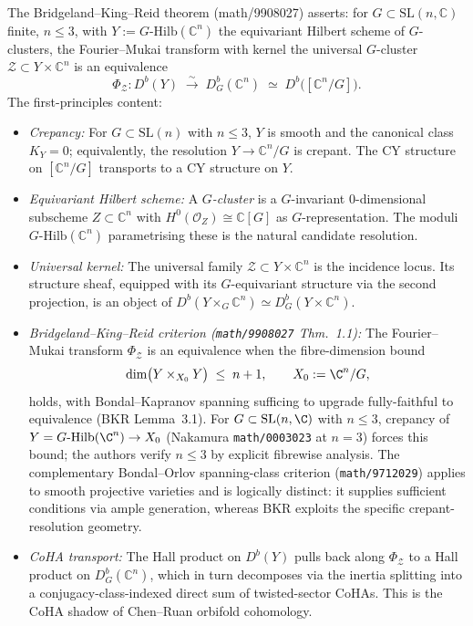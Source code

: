 The Bridgeland--King--Reid theorem (math/9908027) asserts: for $G \subset \mathrm{SL}(n, \mathbb{C})$ finite, $n \leq 3$, with $Y := G\text{-}\mathrm{Hilb}(\mathbb{C}^n)$ the equivariant Hilbert scheme of $G$-clusters, the Fourier--Mukai transform with kernel the universal $G$-cluster $\mathcal{Z} \subset Y \times \mathbb{C}^n$ is an equivalence
\[
\Phi_{\mathcal{Z}} \colon D^b(Y) \;\xrightarrow{\sim}\; D^b_G(\mathbb{C}^n) \;\simeq\; D^b\bigl([\mathbb{C}^n/G]\bigr).
\]
The first-principles content:
\begin{itemize}
 \item \emph{Crepancy:} For $G \subset \mathrm{SL}(n)$ with $n \leq 3$, $Y$ is smooth and the canonical class $K_Y = 0$; equivalently, the resolution $Y \to \mathbb{C}^n/G$ is crepant. The CY structure on $[\mathbb{C}^n/G]$ transports to a CY structure on $Y$.
 \item \emph{Equivariant Hilbert scheme:} A \emph{$G$-cluster} is a $G$-invariant $0$-dimensional subscheme $Z \subset \mathbb{C}^n$ with $H^0(\mathcal{O}_Z) \cong \mathbb{C}[G]$ as $G$-representation. The moduli $G\text{-}\mathrm{Hilb}(\mathbb{C}^n)$ parametrising these is the natural candidate resolution.
 \item \emph{Universal kernel:} The universal family $\mathcal{Z} \subset Y \times \mathbb{C}^n$ is the incidence locus. Its structure sheaf, equipped with its $G$-equivariant structure via the second projection, is an object of $D^b(Y \times_G \mathbb{C}^n) \simeq D^b_G(Y \times \mathbb{C}^n)$.
 \item \emph{Bridgeland--King--Reid criterion (\texttt{math/9908027} Thm.~1.1):} The Fourier--Mukai transform $\Phi_{\mathcal Z}$ is an equivalence when the fibre-dimension bound
 \[
 \dim\bigl(Y \times_{X_0} Y\bigr) \;\leq\; n + 1, \qquad X_0 := \C^n/G,
 \]
 holds, with Bondal--Kapranov spanning sufficing to upgrade fully-faithful to equivalence (BKR Lemma~3.1). For $G \subset \mathrm{SL}(n, \C)$ with $n \leq 3$, crepancy of $Y = G\text{-}\mathrm{Hilb}(\C^n) \to X_0$ (Nakamura \texttt{math/0003023} at $n=3$) forces this bound; the authors verify $n \leq 3$ by explicit fibrewise analysis. The complementary Bondal--Orlov spanning-class criterion (\texttt{math/9712029}) applies to smooth projective varieties and is logically distinct: it supplies sufficient conditions via ample generation, whereas BKR exploits the specific crepant-resolution geometry.
 \item \emph{CoHA transport:} The Hall product on $D^b(Y)$ pulls back along $\Phi_{\mathcal{Z}}$ to a Hall product on $D^b_G(\mathbb{C}^n)$, which in turn decomposes via the inertia splitting into a conjugacy-class-indexed direct sum of twisted-sector CoHAs. This is the CoHA shadow of Chen--Ruan orbifold cohomology.
\end{itemize}


